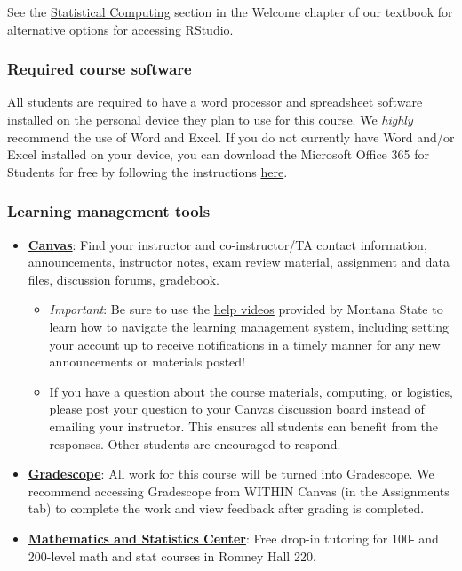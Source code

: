 \documentclass[
]{article}
\providecommand{\tightlist}{%
  \setlength{\itemsep}{0pt}\setlength{\parskip}{0pt}}
\begin{document}
See the
\href{https://mtstateintrostats.github.io/IntroStatTextbook/rstudio.html\#alternative-options-for-accessing-rstudio}{Statistical
Computing} section in the Welcome chapter of our textbook for
alternative options for accessing RStudio.

\subsubsection{Required course software}\label{required-course-software}

All students are required to have a word processor and spreadsheet
software installed on the personal device they plan to use for this
course. We \emph{highly} recommend the use of Word and Excel. If you do
not currently have Word and/or Excel installed on your device, you can
download the Microsoft Office 365 for Students for free by following the
instructions
\href{https://coe.montana.edu/it/students/student-software.html}{here}.

\subsubsection{Learning management
tools}\label{learning-management-tools}

\begin{itemize}
\item
  \href{https://montana.instructure.com/}{\textbf{Canvas}}: Find your
  instructor and co-instructor/TA contact information, announcements,
  instructor notes, exam review material, assignment and data files,
  discussion forums, gradebook.

  \begin{itemize}
  \tightlist
  \item
    \emph{Important}: Be sure to use the
    \href{https://www.montana.edu/ecat/help/learners/}{help videos}
    provided by Montana State to learn how to navigate the learning
    management system, including setting your account up to receive
    notifications in a timely manner for any new announcements or
    materials posted!
  \item
    If you have a question about the course materials, computing, or
    logistics, please post your question to your Canvas discussion board
    instead of emailing your instructor. This ensures all students can
    benefit from the responses. Other students are encouraged to
    respond.
  \end{itemize}
\item
  \href{https://www.gradescope.com/}{\textbf{Gradescope}}: All work for
  this course will be turned into Gradescope. We recommend accessing
  Gradescope from WITHIN Canvas (in the Assignments tab) to complete the
  work and view feedback after grading is completed.
\item
  \href{https://math.montana.edu/undergrad/msc/index.html}{\textbf{Mathematics
  and Statistics Center}}: Free drop-in tutoring for 100- and 200-level
  math and stat courses in Romney Hall 220.
\end{itemize}
\end{document}
